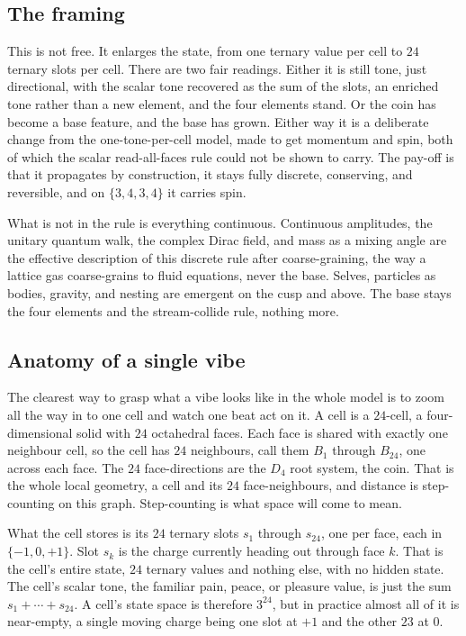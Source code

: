 \subsection{The framing}

This is not free. It enlarges the state, from one ternary value per cell to $24$ ternary slots per cell. There are
two fair readings. Either it is still tone, just directional, with the scalar tone recovered as the sum of the
slots, an enriched tone rather than a new element, and the four elements stand. Or the coin has become a base
feature, and the base has grown. Either way it is a deliberate change from the one-tone-per-cell model, made to
get momentum and spin, both of which the scalar read-all-faces rule could not be shown to carry. The pay-off is
that it propagates by construction, it stays fully discrete, conserving, and reversible, and on $\{3,4,3,4\}$ it
carries spin.

What is not in the rule is everything continuous. Continuous amplitudes, the unitary quantum walk, the complex
Dirac field, and mass as a mixing angle are the effective description of this discrete rule after coarse-graining,
the way a lattice gas coarse-grains to fluid equations, never the base. Selves, particles as bodies, gravity, and
nesting are emergent on the cusp and above. The base stays the four elements and the stream-collide rule, nothing
more.

\subsection{Anatomy of a single vibe}

The clearest way to grasp what a vibe looks like in the whole model is to zoom all the way in to one cell and
watch one beat act on it. A cell is a $24$-cell, a four-dimensional solid with $24$ octahedral faces. Each face is
shared with exactly one neighbour cell, so the cell has $24$ neighbours, call them $B_1$ through $B_{24}$, one
across each face. The $24$ face-directions are the $D_4$ root system, the coin. That is the whole local geometry,
a cell and its $24$ face-neighbours, and distance is step-counting on this graph. Step-counting is what space will
come to mean.

What the cell stores is its $24$ ternary slots $s_1$ through $s_{24}$, one per face, each in $\{-1, 0, +1\}$. Slot
$s_k$ is the charge currently heading out through face $k$. That is the cell's entire state, $24$ ternary values
and nothing else, with no hidden state. The cell's scalar tone, the familiar pain, peace, or pleasure value, is
just the sum $s_1 + \cdots + s_{24}$. A cell's state space is therefore $3^{24}$, but in practice almost all of it
is near-empty, a single moving charge being one slot at $+1$ and the other $23$ at $0$.


